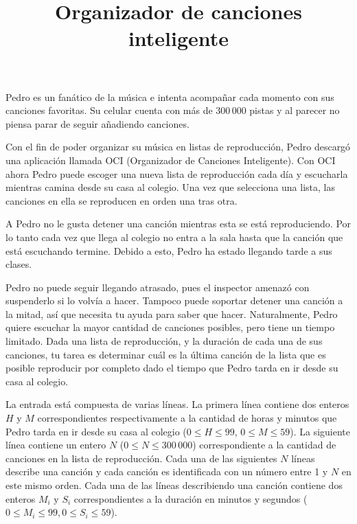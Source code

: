 \documentclass{oci}
\title{Organizador de canciones inteligente}
\begin{document}
\begin{problemDescription}
Pedro es un fanático de la música e intenta acompañar cada momento con sus
canciones favoritas.
Su celular cuenta con más de 300\,000 pistas y al parecer no piensa parar de seguir
añadiendo canciones.

Con el fin de poder organizar su música en listas de reproducción, Pedro
descargó una aplicación llamada OCI (Organizador de Canciones Inteligente).
Con OCI ahora Pedro puede escoger una nueva lista de reproducción cada día y
escucharla mientras camina desde su casa al colegio.
Una vez que selecciona una lista, las canciones en ella se reproducen en orden
una tras otra.

A Pedro no le gusta detener una canción mientras esta se está reproduciendo.
Por lo tanto cada vez que llega al colegio no entra a la sala hasta que la
canción que está escuchando termine.
Debido a esto, Pedro ha estado llegando tarde a sus clases.

Pedro no puede seguir llegando atrasado, pues el inspector amenazó
con suspenderlo si lo volvía a hacer.
Tampoco puede soportar detener una canción a la mitad, así que necesita tu ayuda
para saber que hacer.
Naturalmente, Pedro quiere escuchar la mayor cantidad de canciones posibles,
pero tiene un tiempo limitado.
Dada una lista de reproducción, y la duración de cada una de sus canciones, tu
tarea es determinar cuál es la última canción de la lista que es posible
reproducir por completo dado el tiempo que Pedro tarda en ir desde su casa al
colegio.

\end{problemDescription}

\begin{inputDescription}
  La entrada está compuesta de varias líneas.
  La primera línea contiene dos enteros $H$ y $M$ correspondientes
  respectivamente a la cantidad de horas y minutos que Pedro tarda en ir desde su
  casa al colegio ($0\leq H\leq 99$, $0\leq M\leq 59$).
  La siguiente línea contiene un entero $N$ ($0\leq N\leq 300\,000$)
  correspondiente a la cantidad de canciones en la lista de reproducción.
  Cada una de las siguientes $N$ líneas describe una canción y cada canción es
  identificada con un número entre 1 y $N$ en este mismo orden.
  Cada una de las líneas describiendo una canción contiene dos enteros $M_i$ y $S_i$
  correspondientes a la duración en minutos y segundos ($0\leq
  M_i\leq 99, 0\leq S_i\leq 59$).
\end{inputDescription}
\end{document}
